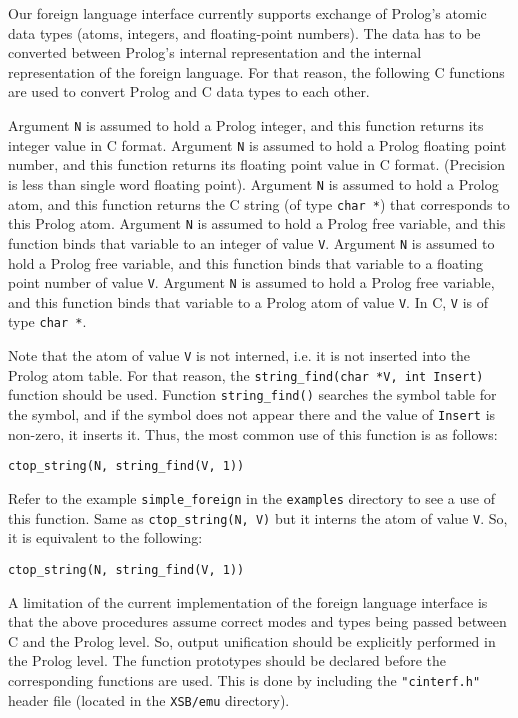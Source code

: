 Our foreign language interface currently supports exchange of Prolog's 
atomic data types (atoms, integers, and floating-point numbers).  The data 
has to be converted between Prolog's internal representation and the internal 
representation of the foreign language.  For that reason, the following 
C functions are used to convert Prolog and C data types to each other.
\begin{description}
        Argument {\tt N} is assumed to hold a Prolog integer, and this
        function returns its integer value in C format.
        Argument {\tt N} is assumed to hold a Prolog floating point number,
        and this function returns its floating point value in C format.
	(Precision is less than single word floating point).
        Argument {\tt N} is assumed to hold a Prolog atom, and this
        function returns the C string (of type {\tt char *}) that 
	corresponds to this Prolog atom.
        Argument {\tt N} is assumed to hold a Prolog free variable, and
        this function binds that variable to an integer of value {\tt V}.
        Argument {\tt N} is assumed to hold a Prolog free variable, and
        this function binds that variable to a floating point number of 
	value {\tt V}.
        Argument {\tt N} is assumed to hold a Prolog free variable, and
        this function binds that variable to a Prolog atom of value {\tt V}.
	In C, {\tt V} is of type {\tt char *}.

	Note that the atom of value {\tt V} is not interned, i.e. it is 
	not inserted into the Prolog atom table.  For that reason, the
	{\tt string\_find(char *V, int Insert)} function should be used.
        Function {\tt string\_find()} searches the symbol table for
	the symbol, and if the symbol does not appear there and the
	value of {\tt Insert} is non-zero, it inserts it.  Thus, the most
	common use of this function is as follows:
	\begin{center}
	{\tt	ctop\_string(N, string\_find(V, 1))	}
	\end{center}
	Refer to the example {\tt simple\_foreign} in the {\tt examples}
	directory to see a use of this function.
	Same as {\tt ctop\_string(N, V)} but it interns the atom of
	value {\tt V}.  So, it is equivalent to the following:
	\begin{center}
	{\tt	ctop\_string(N, string\_find(V, 1))	}
	\end{center}
\end{description}
A limitation of the current implementation of the foreign language
interface is that the above procedures assume correct modes and types
being passed between C and the Prolog level.  So, output unification
should be explicitly performed in the Prolog level.  The function
prototypes should be declared before the corresponding functions are
used.  This is done by including the {\tt "cinterf.h"} header
file (located in the {\tt XSB/emu} directory).

